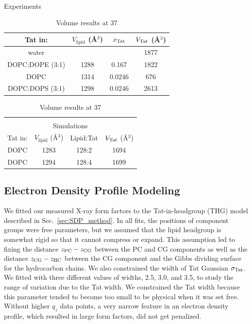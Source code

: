 \begin{table}[htbp]
  \centering
  Experiments\\
  \begin{tabular}{cccc}
    \hline
    Tat in: & $V_\textrm{lipid}$ (\AA$^3$) & $x_\textrm{Tat}$ & $V_\textrm{Tat}$ (\AA$^3$) \\
    \hline
    water & & & 1877 \\
    DOPC:DOPE (3:1) & 1288 & 0.167 & 1822 \\
    DOPC & 1314 & 0.0246 & 676 \\
    DOPC:DOPS (3:1) & 1298 & 0.0246 & 2613 \\
    \hline 
  \end{tabular}
  \quad
  \begin{tabular}{cccc}
    & & & \\
    \multicolumn{4}{c}{Simulations} \\ 
    \hline
    Tat in: & $V_\textrm{lipid}$ (\AA$^3$) & Lipid:Tat & $V_\textrm{Tat}$ (\AA$^3$) \\
    \hline
    DOPC & 1283 & 128:2 & 1694 \\
    DOPC & 1294 & 128.4 & 1699 \\
    \hline
  \end{tabular}
  \caption{Volume results at 37 \textcelsius}
  \label{tab:volumes}
\end{table}

\subsection{Electron Density Profile Modeling}\label{sec:SDP_results}
We fitted our measured X-ray form factors to the Tat-in-headgroup (THG) model described in 
Sec.~\ref{sec:SDP_method}. In all fits,
the positions of component groups were free parameters, but we 
assumed that the lipid headgroup is somewhat rigid so that it cannot compress
or expand. This assumption led to fixing the distance
$z_\textrm{PC}-z_\textrm{CG}$ between the PC and CG components as well
as the distance $z_\textrm{CG}-z_\textrm{HC}$ between the CG component and the Gibbs dividing
surface for the hydrocarbon chains. 
We also constrained the width of Tat 
Gaussian $\sigma_\textrm{Tat}$. We fitted with three different values of widths,
2.5, 3.0, and 3.5, to study the range of variation due to the Tat width. 
We constrained the Tat width 
because this parameter tended to become too small to be physical
when it was set free. Without higher $q_z$ data points, a very narrow feature
in an electron density profile, which resulted in large form factors,
did not get penalized.  


